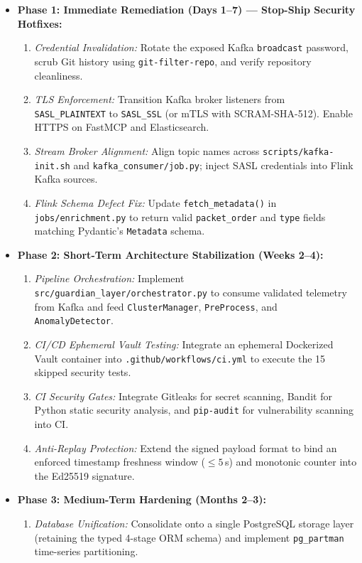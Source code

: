 \documentclass[10pt,a4paper]{report}
\begin{document}
\begin{itemize}[leftmargin=*]
  \item \textbf{Phase 1: Immediate Remediation (Days 1--7) --- Stop-Ship Security Hotfixes:}
  \begin{enumerate}
    \item \textit{Credential Invalidation:} Rotate the exposed Kafka \texttt{broadcast} password, scrub Git history using \texttt{git-filter-repo}, and verify repository cleanliness.
    \item \textit{TLS Enforcement:} Transition Kafka broker listeners from \texttt{SASL\_PLAINTEXT} to \texttt{SASL\_SSL} (or mTLS with SCRAM-SHA-512). Enable HTTPS on FastMCP and Elasticsearch.
    \item \textit{Stream Broker Alignment:} Align topic names across \texttt{scripts/kafka-init.sh} and \texttt{kafka\_consumer/job.py}; inject SASL credentials into Flink Kafka sources.
    \item \textit{Flink Schema Defect Fix:} Update \texttt{fetch\_metadata()} in \texttt{jobs/enrichment.py} to return valid \texttt{packet\_order} and \texttt{type} fields matching Pydantic's \texttt{Metadata} schema.
  \end{enumerate}
  \item \textbf{Phase 2: Short-Term Architecture Stabilization (Weeks 2--4):}
  \begin{enumerate}
    \item \textit{Pipeline Orchestration:} Implement \texttt{src/guardian\_layer/orchestrator.py} to consume validated telemetry from Kafka and feed \texttt{ClusterManager}, \texttt{PreProcess}, and \texttt{AnomalyDetector}.
    \item \textit{CI/CD Ephemeral Vault Testing:} Integrate an ephemeral Dockerized Vault container into \texttt{.github/workflows/ci.yml} to execute the 15 skipped security tests.
    \item \textit{CI Security Gates:} Integrate Gitleaks for secret scanning, Bandit for Python static security analysis, and \texttt{pip-audit} for vulnerability scanning into CI.
    \item \textit{Anti-Replay Protection:} Extend the signed payload format to bind an enforced timestamp freshness window ($\le 5$\,s) and monotonic counter into the Ed25519 signature.
  \end{enumerate}
  \item \textbf{Phase 3: Medium-Term Hardening (Months 2--3):}
  \begin{enumerate}
    \item \textit{Database Unification:} Consolidate onto a single PostgreSQL storage layer (retaining the typed 4-stage ORM schema) and implement \texttt{pg\_partman} time-series partitioning.

\end{enumerate}
\end{itemize}
\end{document}
